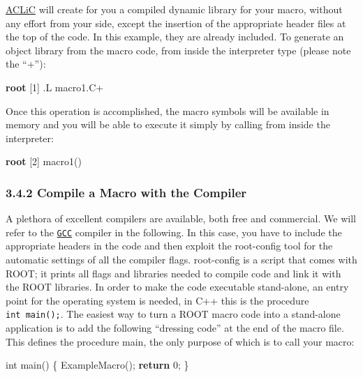 \documentclass{article}
\newenvironment{Shaded}{}{}
\newcommand{\KeywordTok}[1]{\textcolor[rgb]{0.00,0.44,0.13}{\textbf{{#1}}}}
\newcommand{\DataTypeTok}[1]{\textcolor[rgb]{0.56,0.13,0.00}{{#1}}}
\newcommand{\DecValTok}[1]{\textcolor[rgb]{0.25,0.63,0.44}{{#1}}}
\newcommand{\NormalTok}[1]{{#1}}
\begin{document}
\href{https://root.cern.ch/compiling-your-code-also-known-aclic}{ACLiC}
will create for you a compiled dynamic library for your macro, without
any effort from your side, except the insertion of the appropriate
header files at the top of the code. In this example, they are already
included. To generate an object library from the macro code, from inside
the interpreter type (please note the ``+''):

\begin{Shaded}
\begin{Highlighting}[]
 \KeywordTok{root} \NormalTok{[1] .L macro1.C+}
\end{Highlighting}
\end{Shaded}

Once this operation is accomplished, the macro symbols will be available
in memory and you will be able to execute it simply by calling from
inside the interpreter:

\begin{Shaded}
\begin{Highlighting}[]
\KeywordTok{root} \NormalTok{[2] macro1()}
\end{Highlighting}
\end{Shaded}

\subsubsection{3.4.2 Compile a Macro with the
Compiler}\label{compile-a-macro-with-the-compiler}

A plethora of excellent compilers are available, both free and
commercial. We will refer to the
\href{https://gcc.gnu.org/onlinedocs/}{\texttt{GCC}} compiler in the
following. In this case, you have to include the appropriate headers in
the code and then exploit the root-config tool for the automatic
settings of all the compiler flags. root-config is a script that comes
with ROOT; it prints all flags and libraries needed to compile code and
link it with the ROOT libraries. In order to make the code executable
stand-alone, an entry point for the operating system is needed, in C++
this is the procedure \texttt{int\ main();}. The easiest way to turn a
ROOT macro code into a stand-alone application is to add the following
``dressing code'' at the end of the macro file. This defines the
procedure main, the only purpose of which is to call your macro:

\begin{Shaded}
\begin{Highlighting}[]
\DataTypeTok{int} \NormalTok{main() \{}
  \NormalTok{ExampleMacro();}
  \KeywordTok{return} \DecValTok{0}\NormalTok{;}
\NormalTok{\}}
\end{Highlighting}
\end{Shaded}
\end{document}

